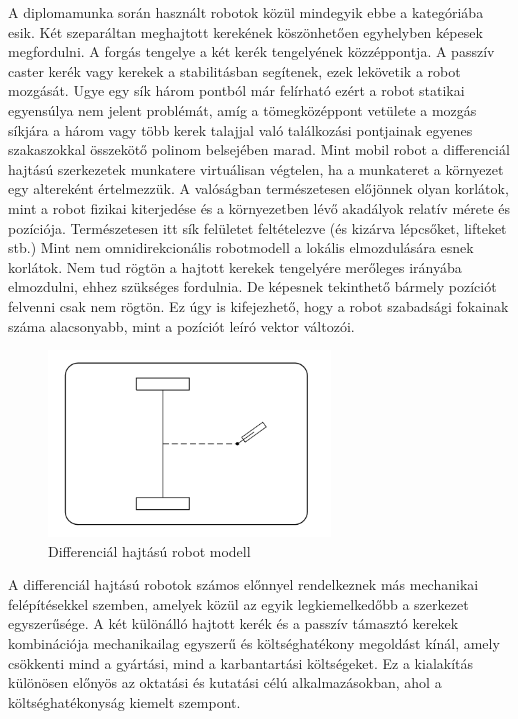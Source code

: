 A diplomamunka során használt robotok közül mindegyik ebbe a kategóriába esik. Két szeparáltan meghajtott kerekének köszönhetően egyhelyben képesek megfordulni. A forgás tengelye a két kerék tengelyének közzéppontja. A passzív caster kerék vagy kerekek a stabilitásban segítenek, ezek lekövetik a robot mozgását. Ugye egy sík három pontból már felírható ezért a robot statikai egyensúlya nem jelent problémát, amíg a tömegközéppont vetülete a mozgás síkjára a három vagy több kerek talajjal való találkozási pontjainak egyenes szakaszokkal összekötő polinom belsejében marad. Mint mobil robot a differenciál hajtású szerkezetek munkatere virtuálisan végtelen, ha a munkateret a környezet egy altereként értelmezzük. A valóságban természetesen előjönnek olyan korlátok, mint a robot fizikai kiterjedése és a környezetben lévő akadályok relatív mérete és pozíciója. Természetesen itt sík felületet feltételezve (és kizárva lépcsőket, lifteket stb.) Mint nem omnidirekcionális robotmodell a lokális elmozdulására esnek korlátok. Nem tud rögtön a hajtott kerekek tengelyére merőleges irányába elmozdulni, ehhez szükséges fordulnia. De képesnek tekinthető bármely pozíciót felvenni csak nem rögtön. Ez úgy is kifejezhető, hogy a robot szabadsági fokainak száma alacsonyabb, mint a pozíciót leíró vektor változói. \cite{siciliano2010robotics} \cite{ros2_control_docs}

\begin{figure}[!ht]
    \centering
    \includegraphics[width=75mm, keepaspectratio]{figures/025_diff_model.png}
    \caption{Differenciál hajtású robot modell \cite{siciliano2010robotics}}
    \label{fig:025_diff_model}
\end{figure}

A differenciál hajtású robotok számos előnnyel rendelkeznek más mechanikai felépítésekkel szemben, amelyek közül az egyik legkiemelkedőbb a szerkezet egyszerűsége. A két különálló hajtott kerék és a passzív támasztó kerekek kombinációja mechanikailag egyszerű és költséghatékony megoldást kínál, amely csökkenti mind a gyártási, mind a karbantartási költségeket. Ez a kialakítás különösen előnyös az oktatási és kutatási célú alkalmazásokban, ahol a költséghatékonyság kiemelt szempont.

